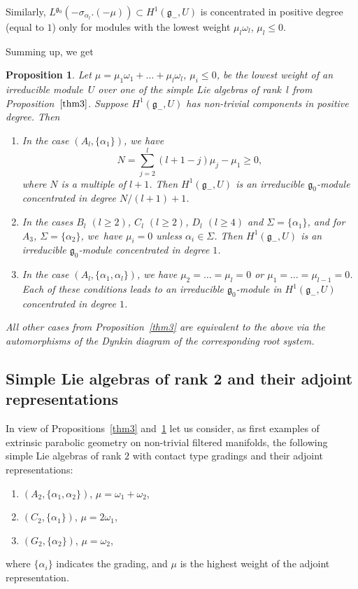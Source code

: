 \documentclass[pdftex]{sigma}%
\newcommand{\g}{\mathfrak g}
\newcommand{\om}{\omega}
\newtheorem{prop}[thm]{Proposition}
\numberwithin{equation}{section}
\begin{document}
Similarly, $L^{\g_0}(-\sigma_{\alpha_l}.(-\mu))\subset H^1(\g_{-},U)$ is concentrated in positive degree (equal to $1$) only for modules with the lowest weight $\mu_l\om_l$, $\mu_l\le 0$.

Summing up, we get
\begin{prop}\label{prop7}
	Let $\mu=\mu_1\om_1+\dots+\mu_l\om_l$, $\mu_i\le 0$, be the lowest weight of an irreducible module~$U$ over one of the simple Lie algebras of rank~$l$ from Proposition~$\ref{thm3}$. Suppose $H^1(\g_{-},U)$ has non-trivial components in positive degree. Then
	\begin{enumerate}\itemsep=0pt
		\item[$1.$] In the case $(A_l,\{\alpha_1\})$, we have
		\[
		N = \sum_{j=2}^l (l+1-j)\mu_j - \mu_1 \ge 0,
		\]
 where $N$ is a multiple of $l+1$. Then $H^1(\g_{-},U)$ is an irreducible $\g_0$-module concentrated in degree $N/(l+1)+1$.

\item[$2.$] In the cases $B_l$ $(l\ge 2)$, $C_l$ $(l\ge 2)$, $D_l$ $(l\ge 4)$ and $\Sigma=\{\alpha_1\}$, and for $A_3$, $\Sigma=\{\alpha_2\}$, we~have $\mu_i=0$ unless $\alpha_i\in\Sigma$. Then $H^1(\g_{-},U)$ is an irreducible $\g_0$-module concentrated in degree $1$.

\item[$3.$] In the case $(A_l,\{\alpha_1,\alpha_l\})$, we have $\mu_2=\dots=\mu_l=0$ or $\mu_1=\dots=\mu_{l-1}=0$. Each of these conditions leads to an irreducible $\g_0$-module in $H^1(\g_{-},U)$ concentrated in degree $1$.
	\end{enumerate}
 All other cases from Proposition~{\rm \ref{thm3}} are equivalent to the above via the automorphisms of the Dynkin diagram of the corresponding root system.
\end{prop}


\subsection{Simple Lie algebras of rank 2 and their adjoint representations}
\label{rank2ex}

In view of Propositions~\ref{thm3} and~\ref{prop7} let us consider, as first examples of extrinsic parabolic geometry on non-trivial filtered manifolds,
the following simple Lie algebras of rank $2$ with contact type gradings and their adjoint representations:
\begin{enumerate}\itemsep=0pt
	\item[$(i)$] $(A_2, \{ \alpha_1, \alpha_2\})$, $\mu=\omega_1+\omega_2$,
	\item[$(ii)$] $(C_2, \{ \alpha_1\})$, $\mu=2\omega_1$,
	\item[$(iii)$] $(G_2,\{ \alpha_2\})$, $\mu=\omega_2$,
\end{enumerate}
where $\{ \alpha _i \}$ indicates the grading, and $\mu$ is the highest weight of the adjoint representation.
\end{document}

